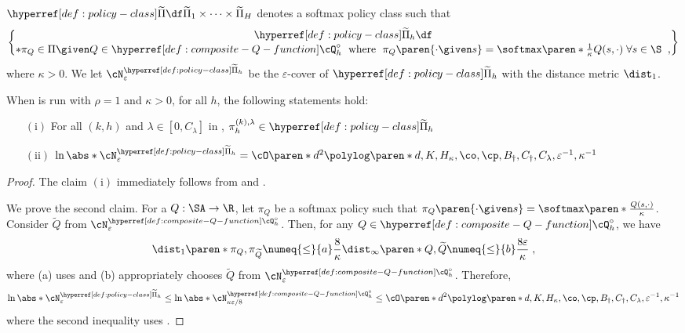 \begin{definition}\label{def:policy-class}
$\tiPi \df \widetilde{\Pi}_1 \times \dots \times \widetilde{\Pi}_H$ denotes a softmax policy class such that 
\begin{align*}
\tiPi_h \df
\brace*{
\pi_Q \in \Pi
\given 
Q \in \Qcomp_h
}
\;\text{ where }\;
\pi_Q\paren{\cdot \given s}=\softmax\paren*{\frac{1}{\kappa}
Q(s, \cdot)
} \; \forall s \in \S\;
\;,
\end{align*}
where $\kappa > 0$.
We let ${\cN}^{\tiPi_h}_{\varepsilon}$ be the $\varepsilon$-cover of $\tiPi_h$ with the distance metric $\dist_1$.
\end{definition}


\begin{lemma}\label{lemma:policy-cover}
When  is run with $\rho =1$ and $\kappa > 0$, for all $h$, the following statements hold:
\begin{itemize}
\item[$(\mathrm{i})$] For all $(k, h)$ and $\lambda \in [0, C_\lambda]$ in , 
\(\pi^{(k), \lambda}_h \in \tiPi_h\)
\item[$(\mathrm{ii})$]
$
\ln \abs*{\cN^{\tiPi_h}_\varepsilon}=
\cO\paren*{d^2} 
\polylog\paren*{d, K, H_\kappa, \co, \cp, B_\dagger, C_\dagger,C_\lambda,\varepsilon^{-1}, \kappa^{-1}}
$
\end{itemize}
\end{lemma}
\begin{proof}
The claim $(\mathrm{i})$ immediately follows from  and .

We prove the second claim.
For a $Q: \SA \to \R$, let $\pi_Q$ be a softmax policy such that $\pi_Q\paren{\cdot \given s} = \softmax\paren*{\frac
{Q(s, \cdot)}{\kappa}}$. 
Consider $\widetilde{Q}$ from $\cN^{\Qcomp_h}_{\varepsilon}$.
Then, for any $Q \in \Qcomp_h$, we have
\begin{align*}
\dist_1\paren*{\pi_{Q}, \pi_{\widetilde{Q}}}
\numeq{\leq}{a} 
\frac{8}{\kappa}
\dist_\infty\paren*{Q, \widetilde{Q}}
\numeq{\leq}{b} \frac{8\varepsilon}{\kappa}\;,
\end{align*}
where (a) uses  and (b) appropriately chooses $\widetilde{Q}$ from $\cN^{\Qcomp_h}_\varepsilon$.
Therefore, 
\begin{align*}
\ln \abs*{\cN^{\tiPi_h}_\varepsilon}
\leq 
\ln \abs*{\cN^{\Qcomp_h}_{\kappa\varepsilon / 8}}
\leq
\cO\paren*{d^2} 
\polylog\paren*{d, K, H_\kappa, \co, \cp, B_\dagger, C_\dagger,C_\lambda,\varepsilon^{-1}, \kappa^{-1}}
\end{align*}
where the second inequality uses .
\end{proof}


